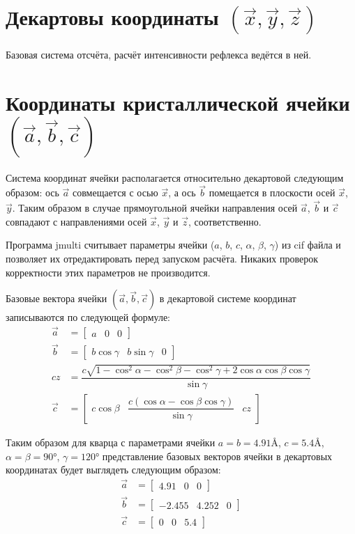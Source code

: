 \documentclass[12pt,a4paper,draft]{article}
\begin{document}
\section{Декартовы координаты $(\vec{x}, \vec{y}, \vec{z})$}
  Базовая система отсчёта, расчёт интенсивности рефлекса ведётся в ней.

\section{Координаты кристаллической ячейки $(\vec{a}, \vec{b}, \vec{c})$}
  Система координат ячейки располагается относительно декартовой следующим
  образом: ось $\vec{a}$ совмещается с осью $\vec{x}$,
  а ось $\vec{b}$ помещается в плоскости осей $\vec{x}$, $\vec{y}$.
  Таким образом в случае прямоугольной ячейки направления
  осей $\vec{a}$, $\vec{b}$ и $\vec{c}$ совпадают с направлениями
  осей $\vec{x}$, $\vec{y}$ и $\vec{z}$, соответственно.

  Программа jmulti считывает параметры ячейки
  ($a$, $b$, $c$, $\alpha$, $\beta$, $\gamma$) из cif файла и позволяет
  их отредактировать перед запуском расчёта.
  Никаких проверок корректности этих параметров не производится.

  Базовые вектора ячейки $(\vec{a}, \vec{b}, \vec{c})$ в декартовой системе
  координат записываются по следующей формуле:
  \begin{align}
    \vec{a} &= \begin{bmatrix} a & 0 & 0 \end{bmatrix} \\
    \vec{b} &= \begin{bmatrix} b \cos\gamma & b \sin\gamma & 0 \end{bmatrix} \\
    cz &= \dfrac{c \sqrt{1 - \cos^2\alpha - \cos^2\beta - \cos^2\gamma + 2 \cos\alpha \cos\beta \cos\gamma}}{\sin\gamma} \nonumber \\
    \vec{c} &= \begin{bmatrix} c \cos\beta & \dfrac{c (\cos\alpha - \cos\beta \cos\gamma)}{\sin\gamma} & cz \end{bmatrix}
  \end{align}

  Таким образом для кварца\cite{quartz} с параметрами ячейки
  $a = b = 4.91 Å$, $c = 5.4 Å$, $\alpha = \beta = 90°$, $\gamma = 120°$
  представление базовых векторов ячейки в декартовых координатах
  будет выглядеть следующим образом:
  \begin{align}
    \vec{a} &= \begin{bmatrix} 4.91 & 0 & 0 \end{bmatrix} \nonumber \\
    \vec{b} &= \begin{bmatrix} -2.455 & 4.252 & 0 \end{bmatrix} \nonumber \\
    \vec{c} &= \begin{bmatrix} 0 & 0 & 5.4 \end{bmatrix} \nonumber
  \end{align}
\end{document}
